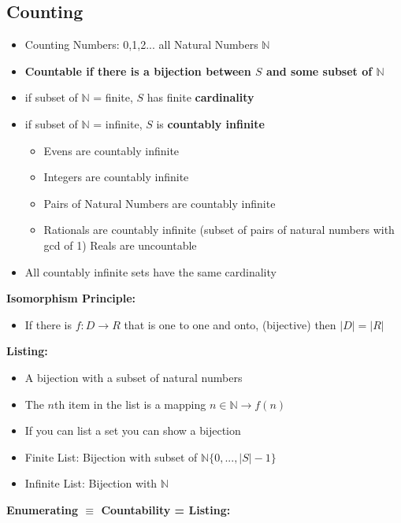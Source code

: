 \documentclass{article}\usepackage{amsmath,amssymb,amsthm,tikz,tkz-graph,color,chngpage,soul,hyperref,csquotes,graphicx,floatrow,circuitikz}\newcommand*{\QEDB}{\hfill\ensuremath{\square}}\newtheorem*{prop}{Proposition}\renewcommand{\theenumi}{\alph{enumi}}\usepackage[shortlabels]{enumitem}\usepackage[nobreak=true]{mdframed}\usetikzlibrary{matrix,calc}\MakeOuterQuote{"}\usepackage[margin=0.75in]{geometry} \newtheorem{theorem}{Theorem}
\begin{document}
\subsection*{Counting}
\begin{itemize}
    \item Counting Numbers: 0,1,2... all Natural Numbers $\mathbb{N}$
    \item \textbf{Countable if there is a bijection between $S$ and some subset of $\mathbb{N}$}
    \item if subset of $\mathbb{N}$ = finite, $S$ has finite \textbf{cardinality}
    \item if subset of $\mathbb{N}$ = infinite, $S$ is \textbf{countably infinite}
        \begin{itemize}
            \item Evens are countably infinite
            \item Integers are countably infinite
            \item Pairs of Natural Numbers are countably infinite
            \item Rationals are countably infinite (subset of pairs of natural numbers with gcd of 1)
            \items Reals are uncountable
        \end{itemize}
    \item All countably infinite sets have the same cardinality
\end{itemize}
\textbf{Isomorphism Principle:}
\begin{itemize}
    \item If there is $f: D\rightarrow R$ that is one to one and onto, (bijective) then $|D| = |R|$
\end{itemize}
\textbf{Listing:}
\begin{itemize}
    \item A bijection with a subset of natural numbers
    \item The $n$th item in the list is a mapping $n \in \mathbb{N} \rightarrow f(n)$
    \item If you can list a set you can show a bijection
    \item Finite List: Bijection with subset of $\mathbb{N}\{0, ..., |S|-1\}$
    \item Infinite List: Bijection with $\mathbb{N}$
\end{itemize}
\textbf{Enumerating $\equiv$ Countability =  Listing:}
\end{document}
